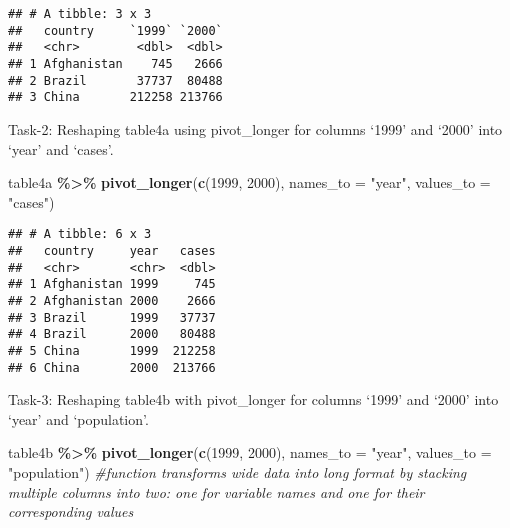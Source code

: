 \documentclass[
]{article}
\newenvironment{Shaded}{\begin{snugshade}}{\end{snugshade}}
\newcommand{\AttributeTok}[1]{\textcolor[rgb]{0.13,0.29,0.53}{#1}}
\newcommand{\CommentTok}[1]{\textcolor[rgb]{0.56,0.35,0.01}{\textit{#1}}}
\newcommand{\FunctionTok}[1]{\textcolor[rgb]{0.13,0.29,0.53}{\textbf{#1}}}
\newcommand{\NormalTok}[1]{#1}
\newcommand{\SpecialCharTok}[1]{\textcolor[rgb]{0.81,0.36,0.00}{\textbf{#1}}}
\newcommand{\StringTok}[1]{\textcolor[rgb]{0.31,0.60,0.02}{#1}}
\begin{document}
\begin{verbatim}
## # A tibble: 3 x 3
##   country     `1999` `2000`
##   <chr>        <dbl>  <dbl>
## 1 Afghanistan    745   2666
## 2 Brazil       37737  80488
## 3 China       212258 213766
\end{verbatim}

Task-2: Reshaping table4a using pivot\_longer for columns `1999' and
`2000' into `year' and `cases'.

\begin{Shaded}
\begin{Highlighting}[]
\NormalTok{table4a }\SpecialCharTok{\%\textgreater{}\%} 
  \FunctionTok{pivot\_longer}\NormalTok{(}\FunctionTok{c}\NormalTok{(}\StringTok{\textasciigrave{}}\AttributeTok{1999}\StringTok{\textasciigrave{}}\NormalTok{, }\StringTok{\textasciigrave{}}\AttributeTok{2000}\StringTok{\textasciigrave{}}\NormalTok{), }\AttributeTok{names\_to =} \StringTok{"year"}\NormalTok{, }\AttributeTok{values\_to =} \StringTok{"cases"}\NormalTok{)}
\end{Highlighting}
\end{Shaded}

\begin{verbatim}
## # A tibble: 6 x 3
##   country     year   cases
##   <chr>       <chr>  <dbl>
## 1 Afghanistan 1999     745
## 2 Afghanistan 2000    2666
## 3 Brazil      1999   37737
## 4 Brazil      2000   80488
## 5 China       1999  212258
## 6 China       2000  213766
\end{verbatim}

Task-3: Reshaping table4b with pivot\_longer for columns `1999' and
`2000' into `year' and `population'.

\begin{Shaded}
\begin{Highlighting}[]
\NormalTok{table4b }\SpecialCharTok{\%\textgreater{}\%} 
  \FunctionTok{pivot\_longer}\NormalTok{(}\FunctionTok{c}\NormalTok{(}\StringTok{\textasciigrave{}}\AttributeTok{1999}\StringTok{\textasciigrave{}}\NormalTok{, }\StringTok{\textasciigrave{}}\AttributeTok{2000}\StringTok{\textasciigrave{}}\NormalTok{), }\AttributeTok{names\_to =} \StringTok{"year"}\NormalTok{, }\AttributeTok{values\_to =} \StringTok{"population"}\NormalTok{)  }\CommentTok{\#function transforms wide data into long format by stacking multiple columns into two: one for variable names and one for their corresponding values}
\end{Highlighting}
\end{Shaded}
\end{document}
